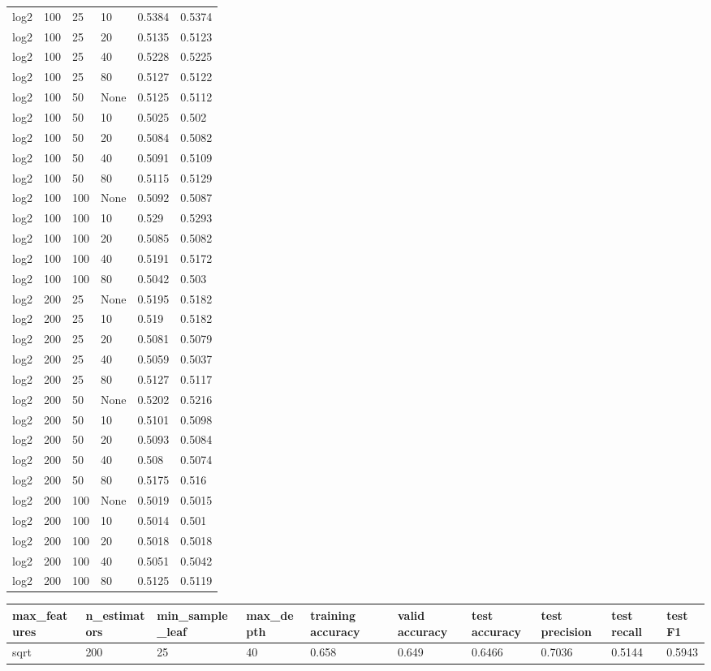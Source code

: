\documentclass{article}%
\begin{document}
\begin{longtable}{l l l l l l}
log2&100&25&10&0.5384&0.5374\\%
log2&100&25&20&0.5135&0.5123\\%
log2&100&25&40&0.5228&0.5225\\%
log2&100&25&80&0.5127&0.5122\\%
log2&100&50&None&0.5125&0.5112\\%
log2&100&50&10&0.5025&0.502\\%
log2&100&50&20&0.5084&0.5082\\%
log2&100&50&40&0.5091&0.5109\\%
log2&100&50&80&0.5115&0.5129\\%
log2&100&100&None&0.5092&0.5087\\%
log2&100&100&10&0.529&0.5293\\%
log2&100&100&20&0.5085&0.5082\\%
log2&100&100&40&0.5191&0.5172\\%
log2&100&100&80&0.5042&0.503\\%
log2&200&25&None&0.5195&0.5182\\%
log2&200&25&10&0.519&0.5182\\%
log2&200&25&20&0.5081&0.5079\\%
log2&200&25&40&0.5059&0.5037\\%
log2&200&25&80&0.5127&0.5117\\%
log2&200&50&None&0.5202&0.5216\\%
log2&200&50&10&0.5101&0.5098\\%
log2&200&50&20&0.5093&0.5084\\%
log2&200&50&40&0.508&0.5074\\%
log2&200&50&80&0.5175&0.516\\%
log2&200&100&None&0.5019&0.5015\\%
log2&200&100&10&0.5014&0.501\\%
log2&200&100&20&0.5018&0.5018\\%
log2&200&100&40&0.5051&0.5042\\%
log2&200&100&80&0.5125&0.5119\\%
\hline%
\end{longtable}%
\begin{longtable}{l l l l l l l l l l}%
\hline%
max\_features&n\_estimators&min\_sample\_leaf&max\_depth&training accuracy&valid accuracy&test accuracy&test precision&test recall&test F1\\%
\hline%
\endhead%
\hline%
sqrt&200&25&40&0.658&0.649&0.6466&0.7036&0.5144&0.5943\\%
\hline%
\end{longtable}%
\end{document}
